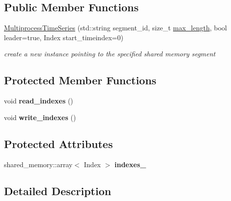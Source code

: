 \subsection*{Public Member Functions}
\begin{DoxyCompactItemize}
\item 
\hyperlink{classtime__series_1_1MultiprocessTimeSeries_a118890497b42365a56221c66edbb478e}{Multiprocess\+Time\+Series} (std\+::string segment\+\_\+id, size\+\_\+t \hyperlink{classtime__series_1_1internal_1_1TimeSeriesBase_aee1bf636a094a3068f9de731688c3972}{max\+\_\+length}, bool leader=true, Index start\+\_\+timeindex=0)
\begin{DoxyCompactList}\small\item\em create a new instance pointing to the specified shared memory segment \end{DoxyCompactList}\end{DoxyCompactItemize}
\subsection*{Protected Member Functions}
\begin{DoxyCompactItemize}
\item 
void {\bfseries read\+\_\+indexes} ()\hypertarget{classtime__series_1_1MultiprocessTimeSeries_a44445322f664019684a02caa31639c14}{}\label{classtime__series_1_1MultiprocessTimeSeries_a44445322f664019684a02caa31639c14}

\item 
void {\bfseries write\+\_\+indexes} ()\hypertarget{classtime__series_1_1MultiprocessTimeSeries_abc59736f908b8e3f4e6881607e2253a7}{}\label{classtime__series_1_1MultiprocessTimeSeries_abc59736f908b8e3f4e6881607e2253a7}

\end{DoxyCompactItemize}
\subsection*{Protected Attributes}
\begin{DoxyCompactItemize}
\item 
shared\+\_\+memory\+::array$<$ Index $>$ {\bfseries indexes\+\_\+}\hypertarget{classtime__series_1_1MultiprocessTimeSeries_a0ae05ba33e9f73f839e2229677062518}{}\label{classtime__series_1_1MultiprocessTimeSeries_a0ae05ba33e9f73f839e2229677062518}

\end{DoxyCompactItemize}


\subsection{Detailed Description}
